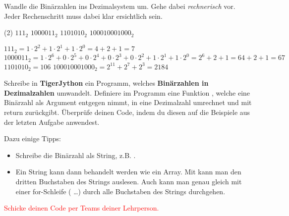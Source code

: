 \newpage

\begin{question}
	Wandle die Binärzahlen ins Dezimalsystem um. Gehe dabei \textit{rechnerisch} vor. Jeder Rechenschritt muss dabei klar ersichtlich sein.
	\begin{tasks}(2)
		\task $111_2$
		\task $1000011_2$
		\task $1101010_2$
		\task $100010001000_2$
	\end{tasks}
\end{question}
\begin{solution}
	\begin{tasks}
		\task $111_2 = 1\cdot2^2+1\cdot2^1+1\cdot2^0 = 4+2+1 = 7$
		\task $1000011_2 = 1\cdot2^6+0\cdot2^5+0\cdot2^4+0\cdot2^3+0\cdot2^2+1\cdot2^1+1\cdot2^0
		= 2^6+2+1=64+2+1=67$
		\task $1101010_2=106$
		\task $100010001000_2 = 2^{11}+2^7+2^3 = 2184$
	\end{tasks}
\end{solution}

\begin{question}
	Schreibe in \textbf{TigerJython} ein Programm, welches \textbf{Binärzahlen in Dezimalzahlen} umwandelt. Definiere im Programm eine Funktion , welche eine Binärzahl  als Argument entgegen nimmt, in eine Dezimalzahl umrechnet und mit return zurückgibt. Überprüfe deinen Code, indem du diesen auf die Beispiele aus der letzten Aufgabe anwendest.

	Dazu einige Tipps:
	\begin{itemize}
		\vspace{-\topsep}
		\item Schreibe die Binärzahl als String,  z.B. .
		\item Ein String kann dann behandelt werden wie ein Array. Mit  kann man den dritten Buchstaben des Strings  auslesen. Auch kann man genau gleich mit einer for-Schleife ( \ldots) durch alle Buchstaben des Strings durchgehen. 
	\end{itemize}
\end{question}
\begin{solution}
	\textcolor{red}{Schicke deinen Code per Teams deiner Lehrperson.}

		
	
\end{solution}

